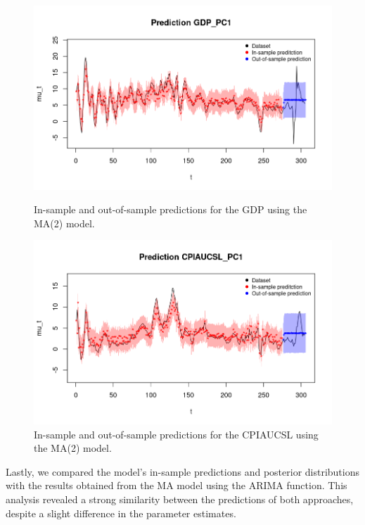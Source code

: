 \begin{figure}[H]
    \centering
    \begin{minipage}{0.49\textwidth}
        \centering
        \includegraphics[width=\textwidth]{images/3-MA/gdp_prediction2.png}
        \caption{In-sample and out-of-sample predictions for the GDP using the MA(2) model.}
        \label{fig:MA2_gdp_prediction}
    \end{minipage}\hfill
    \begin{minipage}{0.49\textwidth}
        \centering
        \includegraphics[width=\textwidth]{images/3-MA/infl_prediction2.png}
        \caption{In-sample and out-of-sample predictions for the CPIAUCSL using the MA(2) model.}
        \label{fig:MA2_infl_prediction}
    \end{minipage}
\end{figure}
Lastly, we compared the model's in-sample predictions and posterior distributions with the results obtained from the MA model using the ARIMA function. This analysis revealed a strong similarity between the predictions of both approaches, despite a slight difference in the parameter estimates.
